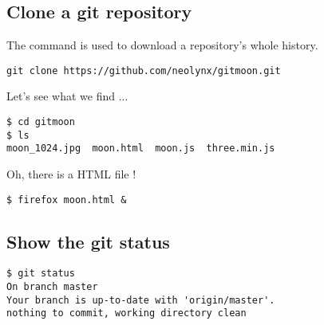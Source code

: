 
\subsection{Clone a git repository}
\begin{frame}[fragile]
  \subslidetitle
  The command  is used to download a repository's whole history.
  \begin{lstlisting}
git clone https://github.com/neolynx/gitmoon.git
  \end{lstlisting}


  Let's see what we find ...
  \begin{lstlisting}
$ cd gitmoon
$ ls
moon_1024.jpg  moon.html  moon.js  three.min.js
  \end{lstlisting}

  Oh, there is a HTML file !
  \begin{lstlisting}
$ firefox moon.html &
  \end{lstlisting}

\end{frame}

\subsection{Show the git status}
\begin{frame}[fragile]
  \subslidetitle
  \begin{lstlisting}
$ git status
On branch master
Your branch is up-to-date with 'origin/master'.
nothing to commit, working directory clean
  \end{lstlisting}
\end{frame}


